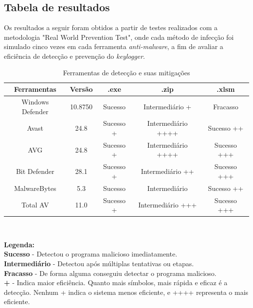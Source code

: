 \documentclass[12pt]{article}
\begin{document}
\subsection{Tabela de resultados}
Os resultados a seguir foram obtidos a partir de testes realizados com a metodologia "Real World Prevention Test", onde cada método de infecção foi simulado cinco vezes em cada ferramenta \textit{anti-malware}, a fim de avaliar a eficiência de detecção e prevenção do \textit{keylogger}.
\begin{table}[h!]
    \centering
    \begin{tabular}{|c|c|c|c|c|}
        \hline
        \textbf{Ferramentas} & \textbf{Versão} & \textbf{.exe} & \textbf{.zip}      & \textbf{.xlsm} \\
        \hline
        Windows Defender     & 10.8750    & Sucesso       & Intermediário +    & Fracasso       \\
        \hline
        Avast                & 24.8      & Sucesso +     & Intermediário ++++ & Sucesso ++     \\
        \hline
        AVG                  & 24.8      & Sucesso +     & Intermediário ++++ & Sucesso +++    \\
        \hline
        Bit Defender         & 28.1      & Sucesso +     & Intermediário ++   & Sucesso +++    \\
        \hline
        MalwareBytes         & 5.3       & Sucesso       & Intermediário      & Sucesso ++     \\
        \hline
        Total AV             & 11.0         & Sucesso +     & Intermediário +++  & Sucesso +++    \\
        \hline
    \end{tabular}\\

    \caption{Ferramentas de detecção e suas mitigações}

    \label{tab:ferramentas}
\end{table}
\begin{flushleft}
    \textbf{Legenda:} \\
    \textbf{Sucesso} - Detectou o programa malicioso imediatamente.\\
    \textbf{Intermediário} - Detectou após múltiplas tentativas ou etapas.\\
    \textbf{Fracasso} - De forma alguma conseguiu detectar o programa malicioso.\\
    \textbf{+} - Indica maior eficiência. Quanto mais símbolos, mais rápida e eficaz é a detecção. Nenhum + indica o sistema menos eficiente, e ++++ representa o mais eficiente.
\end{flushleft}
\end{document}
